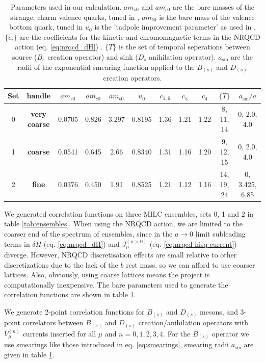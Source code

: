\begin{table}[htb!]
\hspace{-40pt}
 \begin{tabular}{c c c c c c c c c c c}
 \hline
 Set & handle & $am_{s0}$ & $am_{c0}$ & $am_{b0}$ & $u_0$ & $c_{1,6}$ & $c_5$ & $c_4$ & $\{T\}$ & $a_{\text{sm}}/a$ \\ [0.5ex] 
 \hline
 0 & {\textbf{very coarse}} & 0.0705 & 0.826 & 3.297 & 0.8195 & 1.36 & 1.21 & 1.22 & 8, 11, 14 & 0, 2.0, 4.0 \\ [1ex]
 1 & {\textbf{coarse}} & 0.0541 & 0.645 & 2.66 & 0.8340 & 1.31 & 1.16 & 1.20 & 9, 12, 15 & 0, 2.0, 4.0 \\ [1ex]
 2 & {\textbf{fine}} & 0.0376 & 0.450 & 1.91 & 0.8525 &  1.21 & 1.12 & 1.16 & 14, 19, 24 & 0, 3.425, 6.85 \\ [1ex]
 \hline
\end{tabular}
 \caption{Parameters used in our calculation. $am_{s0}$ and $am_{c0}$ are the bare masses of the strange, charm valence quarks, tuned in \cite{PhysRevD.91.054508}, $am_{b0}$ is the bare mass of the valence bottom quark, tuned in \cite{Dowdall:2011wh} $u_0$ is the 'tadpole improvement parameter' as used in \cite{Dowdall:2011wh}. $\{c_i\}$ are the coefficients for the kinetic and chromomagnetic terms in the NRQCD action (eq. \eqref{eq:nrqcd_dH}) \cite{Hammant:2013sca}. $\{T\}$ is the set of temporal seperations between source ($B_s$ creation operator) and sink ($D_s$ anihilation operator). $a_{\text{sm}}$ are the radii of the exponential smearing function applied to the $B_{(s)}$ and $D_{(s)}$ creation operators.
   \label{tab:quarkmasses}}
\end{table}

We generated correlation functions on three MILC ensembles, sets 0, 1 and 2 in table \ref{tab:ensembles}. When using the NRQCD action, we are limited to the coarser end of the spectrum of ensembles, since in the $a\to 0$ limit subleading terms in $\delta H$ (eq. \eqref{eq:nrqcd_dH}) and $J^{(n>0)}_{\mu}$ (eq. \eqref{eq:nrqcd-hisq-current}) diverge. However, NRQCD discretisation effects are small relative to other discretizations due to the lack of the $b$ rest mass, so we can afford to use coarser lattices. Also, obviously, using coarse lattices means the project is computationally inexpensive. The bare parameters used to generate the correlation functions are shown in table \ref{tab:quarkmasses}.

We generate 2-point correlation functions for $B_{(s)}$ and $D_{(s)}$ mesons, and 3-point correlators between $B_{(s)}$ and $D_{(s)}$ creation/anihilation operators with $V^{(n)}_{\mu}$ currents inserted for all $\mu$ and $n=0,1,2,3,4$. For the $B_{(s)}$ operator we use smearings like those introduced in eq. \eqref{eq:smearings}, smearing radii $a_{\text{sm}}$ are given in table \ref{tab:quarkmasses}.

